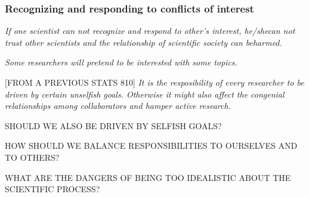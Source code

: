 \documentclass{beamer}
\begin{document}
\begin{frame} %
 \frametitle{ Recognizing and responding to conflicts of interest}


{\it If one scientist can not recognize and respond to other’s interest, he/shecan  not  trust  other  scientists  and  the  relationship  of  scientific  society  can  beharmed.}

\medskip

{\it Some researchers will pretend to be interested with some topics.}



\end{frame}

\begin{frame}
  
[FROM A PREVIOUS STATS 810] {\it It is the resposibility of every researcher to be driven by certain unselfish goals. Otherwise it might also affect the congenial relationships among collaborators and hamper active research.}

\medskip 

SHOULD WE ALSO BE DRIVEN BY SELFISH GOALS? 

\medskip

HOW SHOULD WE BALANCE RESPONSIBILITIES TO OURSELVES AND TO OTHERS?

\medskip

WHAT ARE THE DANGERS OF BEING TOO IDEALISTIC ABOUT THE SCIENTIFIC PROCESS?

\end{frame}



\end{document}
